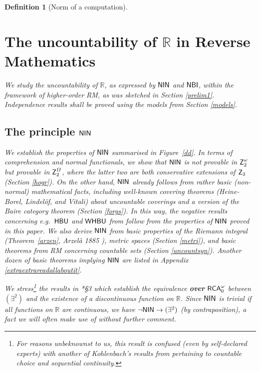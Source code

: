 \documentclass[reqno]{amsart}
\newtheorem{defi}[thm]{Definition}
\def\Z{\textup{\textsf{Z}}}
\def\RCAo{\textup{\textsf{RCA}}_{0}^{\omega}}
\def\R{{\mathbb  R}}
\def\di{\rightarrow}
\def\HBU{\textup{\textsf{HBU}}}
\def\NBI{\textup{\textsf{NBI}}}
\def\NIN{\textup{\textsf{NIN}}}
\def\WHBU{\textup{\textsf{WHBU}}}
\numberwithin{equation}{section}
\numberwithin{thm}{section}
\begin{document}
\begin{defi}[Norm of a computation]
\section{The uncountability of $\R$ in Reverse Mathematics}\label{main}
We study the uncountability of $\R$, as expressed by $\NIN$ and $\NBI$, within the framework of higher-order RM, as was sketched in Section \ref{prelim1}.
Independence results shall be proved using the models from Section \ref{models}.  

\subsection{The principle $\NIN$}
We establish the properties of $\NIN$ summarised in Figure~\ref{dd}.  
In terms of comprehension and normal functionals, we show that $\NIN$ is not provable in $\Z_{2}^{\omega}$ but provable in $\Z_{2}^{\Omega}$, where the latter two are both conservative extensions of $\Z_{2}$ (Section \ref{hogr}).
On the other hand, $\NIN$ already follows from rather basic (non-normal) mathematical facts, including well-known covering theorems (Heine-Borel, Lindel\"of, and Vitali) about \emph{uncountable coverings} and a version of the Baire category theorem (Section \ref{forgs}).  
In this way, the negative results concerning e.g.\ $\HBU$ and $\WHBU$ from \cites{dagsamIII, dagsamVI, dagsamVII} follow from the properties of $\NIN$ proved in this paper.  
We also derive $\NIN$ from basic properties of the Riemann integral (Theorem~\ref{arzen}, Arzel\`a 1885 \cite{arse2}), metric spaces (Section \ref{metri}), and basic theorems from RM concerning countable sets (Section \ref{uncountsyn}).
Another dozen of basic theorems implying $\NIN$ are listed in Appendix \ref{extraextrareadallaboutit}.

\smallskip

We stress\footnote{For reasons unbeknownst to us, this result is confused (even by self-declared experts) with another of Kohlenbach's results from \cite{kohlenbach2} pertaining to countable choice and sequential continuity.} the results in \cite{kohlenbach2}*{\S3} which establish the equivalence \textbf{over} $\RCAo$ between $(\exists^{2})$ and the existence of a discontinuous function on $\R$.  
Since $\NIN$ is trivial if all functions on $\R$ are continuous, we have $\neg\NIN\di(\exists^{2})$ (by contraposition), a fact we will often make use of \emph{without further comment}.  



\end{defi}
\end{document}
